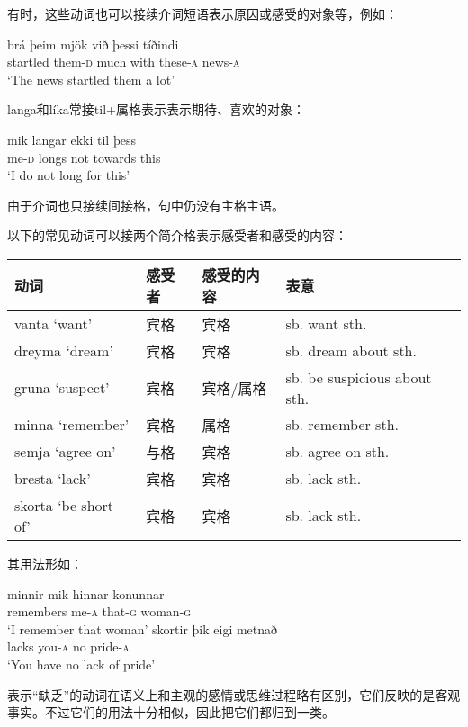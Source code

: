 \begin{enumerate}
\begin{enumerate}
有时，这些动词也可以接续介词短语表示原因或感受的对象等，例如：
\begin{exe}
    \ex \gll 
    brá	þeim	mjök	við	þessi	tíðindi\\
startled	them-\textsc{d}	much	with	these-\textsc{a}	news-\textsc{a}\\
\trans `The news startled them a lot’
\end{exe}

langa和líka常接til+属格表示表示期待、喜欢的对象：
\begin{exe}
    \ex \gll
    mik	langar	ekki	til	þess\\
me-\textsc{d}	longs	not	towards	this\\
\trans `I do not long for this’
\end{exe}

由于介词也只接续间接格，句中仍没有主格主语。

以下的常见动词可以接两个简介格表示感受者和感受的内容：
\begin{table}[H]
    \centering
    \begin{tabular}{llll}
    \toprule
动词	&感受者&	感受的内容	&表意\\
\midrule
vanta `want’&	宾格&	宾格&	sb. want sth.\\
dreyma `dream’&	宾格&	宾格&	sb. dream about sth.\\
gruna `suspect’	&宾格&	宾格/属格&	sb. be suspicious about sth.\\
minna `remember’&	宾格&	属格&	sb. remember sth.\\
semja `agree on’&	与格	&宾格&	sb. agree on sth.\\
bresta `lack’&	宾格&	宾格&	sb. lack sth.\\
skorta `be short of’&	宾格	&宾格&	sb. lack sth.\\
\bottomrule
    \end{tabular}
\end{table}

其用法形如：
\begin{exe}
    \ex \gll
    minnir	mik	hinnar	konunnar\\
remembers	me-\textsc{a}	that-\textsc{g}	woman-\textsc{g}\\
\trans `I remember that woman’
\ex \gll
skortir	þik	eigi	metnað\\
lacks	you-\textsc{a}	no	pride-\textsc{a}\\
\trans `You have no lack of pride‌’
\end{exe}

表示“缺乏”的动词在语义上和主观的感情或思维过程略有区别，它们反映的是客观事实。不过它们的用法十分相似，因此把它们都归到一类。


\end{enumerate}
\end{enumerate}
